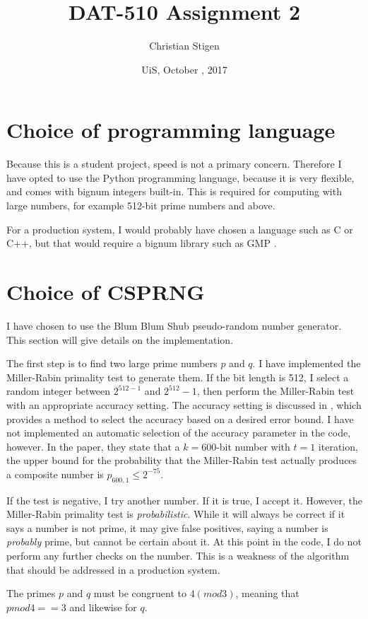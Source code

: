 \documentclass[a4paper,english,12pt]{article}
\title{DAT-510 Assignment 2}
\author{Christian Stigen}
\date{UiS, October \nth{9}, 2017}
\begin{document}
\maketitle

\begin{abstract}
\end{abstract}

\section{Choice of programming language}
Because this is a student project, speed is not a primary concern. Therefore I
have opted to use the Python programming language, because it is very flexible,
and comes with bignum integers built-in. This is required for computing with
large numbers, for example 512-bit prime numbers and above.

For a production system, I would probably have chosen a
language such as C or C++, but that would require a bignum library such as GMP
\cite{wiki:gmp}.

\section{Choice of CSPRNG}
I have chosen to use the Blum Blum Shub \cite{bbs} pseudo-random number
generator. This section will give details on the implementation.

The first step is to find two large prime numbers $p$ and $q$. I have
implemented the Miller-Rabin \cite{miller.rabin} primality test to generate
them.
%
If the bit length is 512, I select a random integer between $2^{512-1}$ and
$2^{512}-1$, then perform the Miller-Rabin test with an appropriate accuracy
setting. The accuracy setting is discussed in \cite{damgaard1993average}, which
provides a method to select the accuracy based on a desired error bound. I have
not implemented an automatic selection of the accuracy parameter in the code,
however. In the paper, they state that a $k=600$-bit number with $t=1$
iteration, the upper bound for the probability that the Miller-Rabin test
actually produces a composite number is $p_{600, 1} \leqslant 2^{-75}$.

If the test is negative, I try another number. If it is true, I accept
it. However, the Miller-Rabin primality test is \textit{probabilistic}. While
it will always be correct if it says a number is not prime, it may give false
positives, saying a number is \textit{probably} prime, but cannot be certain
about it. At this point in the code, I do not perform any further checks on the
number. This is a weakness of the algorithm that should be addressed in a
production system.

The primes $p$ and $q$ must be congruent to $4 (mod 3)$, meaning that $p mod 4
== 3$ and likewise for $q$.



\end{document}
